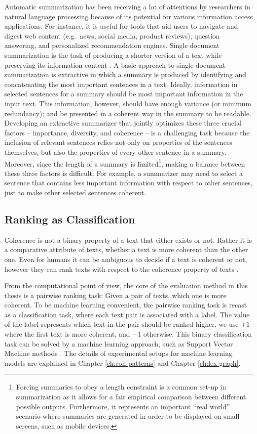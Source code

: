 Automatic summarization has been receiving a lot of attentions by researchers in natural language processing because of its potential for various information access applications. 
For instance, it is useful for tools that aid users to navigate and digest web content (e.g.\ news, social media, product reviews), question answering, and personalized recommendation engines. 
Single document summarization is the task of producing a shorter version of a text while preserving its information content \cite{nenkova11}. 
A basic approach to single document summarization is extractive in which a summary is produced by identifying and concatenating the most important sentences in a text. 
Ideally, information in selected sentences for a summary should be most important information in the input text. 
This information, however, should have enough variance (or minimum redundancy); and be presented in a coherent way in the summary to be readable. 
Developing an extractive summarizer that jointly optimizes these three crucial factors -- importance, diversity, and coherence -- is a challenging task because the inclusion of relevant sentences relies not only on properties of the sentences themselves, but also the properties of every other sentence in a summary. 
Moreover, since the length of a summary is limited\footnote{Forcing summaries to obey a length constraint is a common set-up in summarization as it allows for a fair empirical comparison between different possible outputs. 
 Furthermore, it represents an important ``real world'' scenario where summaries are generated in order to be displayed on small screens, such as mobile devices.
}, making a balance between these three factors is difficult. 
For example, a summarizer may need to select a sentence that contains less important information with respect to other sentences, just to make other selected sentences coherent. 

\subsection{Ranking as Classification} 

Coherence is not a binary property of a text that either exists or not. 
Rather it is a comparative attribute of texts, whether a text is more coherent than the other one. 
Even for humans it can be ambiguous to decide if a text is coherent or not, however they can rank texts with respect to the coherence property of texts \cite{halliday76}.   

From the computational point of view, the core of the evaluation method in this thesis is a pairwise ranking task: Given a pair of texts, which one is more coherent. 
To be machine learning convenient, the pairwise ranking task is recast as a classification task, where each text pair is associated with a label. 
The value of the label represents which text in the pair should be ranked higher, we use $+1$ where the first text is more coherent, and $-1$ otherwise. 
This binary classification task can be solved by a machine learning approach, such as Support Vector Machine methods \cite{bishop06}.  
The details of experimental setups for machine learning models are explained in Chapter \ref{ch:coh-patterns} and Chapter \ref{ch:lex-graph}.  

